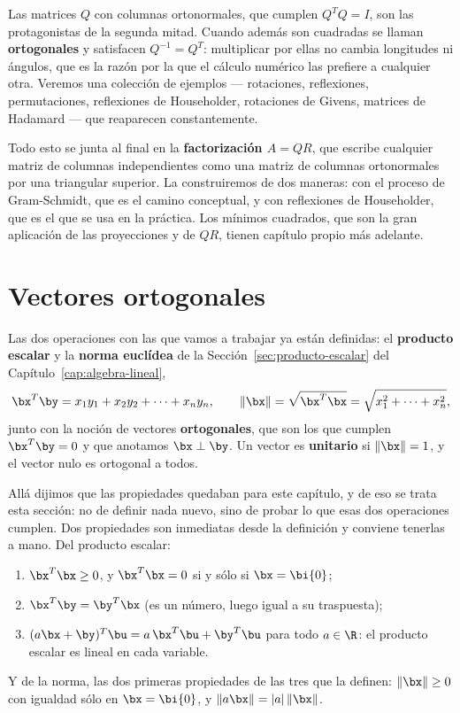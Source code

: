 Las matrices $Q$ con columnas ortonormales, que cumplen $Q^TQ=I$, son las
protagonistas de la segunda mitad. Cuando además son cuadradas se llaman
\textbf{ortogonales} y satisfacen $Q^{-1}=Q^T$: multiplicar por ellas no
cambia longitudes ni ángulos, que es la razón por la que el cálculo numérico
las prefiere a cualquier otra. Veremos una colección de ejemplos --- rotaciones,
reflexiones, permutaciones, reflexiones de Householder, rotaciones de Givens,
matrices de Hadamard --- que reaparecen constantemente.

Todo esto se junta al final en la \textbf{factorización $A=QR$}, que escribe
cualquier matriz de columnas independientes como una matriz de columnas
ortonormales por una triangular superior. La construiremos de dos maneras: con
el proceso de Gram-Schmidt, que es el camino conceptual, y con reflexiones de
Householder, que es el que se usa en la práctica. Los mínimos cuadrados, que
son la gran aplicación de las proyecciones y de $QR$, tienen capítulo propio
más adelante.

\section{Vectores ortogonales}

Las dos operaciones con las que vamos a trabajar ya están definidas: el
\textbf{producto escalar} y la \textbf{norma euclídea} de la
Sección~\ref{sec:producto-escalar} del Capítulo~\ref{cap:algebra-lineal},
\[
\bx^T\by=x_1y_1+x_2y_2+\cdots+x_ny_n ,
\qquad
\|\bx\|=\sqrt{\bx^T\bx}=\sqrt{x_1^2+\cdots+x_n^2} ,
\]
junto con la noción de vectores \textbf{ortogonales}, que son los que cumplen
$\bx^T\by=0$ y que anotamos $\bx\perp\by$. Un vector es \textbf{unitario} si
$\|\bx\|=1$, y el vector nulo es ortogonal a todos.

Allá dijimos que las propiedades quedaban para este capítulo, y de eso se
trata esta sección: no de definir nada nuevo, sino de probar lo que esas dos
operaciones cumplen. Dos propiedades son inmediatas desde la definición y
conviene tenerlas a mano. Del producto escalar:
\begin{enumerate}[label=\textup{(\arabic*)},itemsep=1pt,topsep=3pt]
\item $\bx^T\bx\ge0$, y $\bx^T\bx=0$ si y sólo si $\bx=\bi{0}$;
\item $\bx^T\by=\by^T\bx$ (es un número, luego igual a su traspuesta);
\item $(a\bx+\by)^T\bu=a\,\bx^T\bu+\by^T\bu$ para todo $a\in\R$: el producto
escalar es lineal en cada variable.
\end{enumerate}
Y de la norma, las dos primeras propiedades de las tres que la definen:
$\|\bx\|\ge0$ con igualdad sólo en $\bx=\bi{0}$, y $\|a\bx\|=|a|\,\|\bx\|$.

